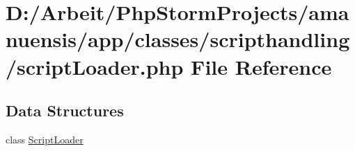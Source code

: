 \hypertarget{a00103}{}\section{D\+:/\+Arbeit/\+Php\+Storm\+Projects/amanuensis/app/classes/scripthandling/script\+Loader.php File Reference}
\label{a00103}
\subsection*{Data Structures}
\begin{DoxyCompactItemize}
\item 
class \hyperlink{a00042}{Script\+Loader}
\end{DoxyCompactItemize}
